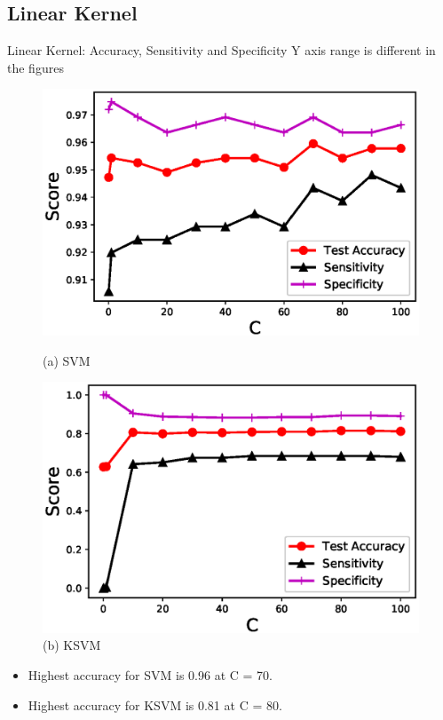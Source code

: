 \documentclass[xcolor=dvipsnames]{beamer}
\begin{document}
\subsection{Linear Kernel}

\begin{frame}{Linear Kernel: Accuracy, Sensitivity and Specificity}
\alert{Y axis range is different in the figures}
\begin{figure}[H]
\begin{minipage}[t]{0.5\linewidth}
    \includegraphics[scale=0.43]{Figures/SVM_Linear_Accuracy.eps}
    \caption*{(a) SVM}
\end{minipage}%
\begin{minipage}[t]{0.5\linewidth}
    \includegraphics[scale=0.43]{Figures/KSVM_Linear_Accuracy.eps}
    \caption*{(b) KSVM}
\end{minipage} 
\end{figure}

\begin{block}{}
\begin{itemize}
\item Highest accuracy for SVM is 0.96 at C = 70.
\item Highest accuracy for KSVM is 0.81 at C = 80.
\end{itemize}
\end{block}
\end{frame}
\end{document}
